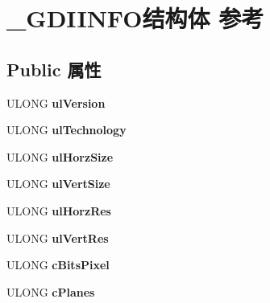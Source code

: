 \hypertarget{struct___g_d_i_i_n_f_o}{}\section{\+\_\+\+G\+D\+I\+I\+N\+F\+O结构体 参考}
\label{struct___g_d_i_i_n_f_o}
\subsection*{Public 属性}
\begin{DoxyCompactItemize}
\item 
\mbox{\label{struct___g_d_i_i_n_f_o_ad2dc1fe9ceb8cca06f349d38ad5433b0}} 
U\+L\+O\+NG {\bfseries ul\+Version}
\item 
\mbox{\label{struct___g_d_i_i_n_f_o_a502f4f5747602c9b7cb45afcba455518}} 
U\+L\+O\+NG {\bfseries ul\+Technology}
\item 
\mbox{\label{struct___g_d_i_i_n_f_o_abc5af8d569d960dd0b7408a09f5b00fa}} 
U\+L\+O\+NG {\bfseries ul\+Horz\+Size}
\item 
\mbox{\label{struct___g_d_i_i_n_f_o_a02eb98d0ad928e5e03af8429870d1ff3}} 
U\+L\+O\+NG {\bfseries ul\+Vert\+Size}
\item 
\mbox{\label{struct___g_d_i_i_n_f_o_acd63f4d201a3a234d2047ca73e8d906d}} 
U\+L\+O\+NG {\bfseries ul\+Horz\+Res}
\item 
\mbox{\label{struct___g_d_i_i_n_f_o_a7b30abec97e349c37adc05bead25104e}} 
U\+L\+O\+NG {\bfseries ul\+Vert\+Res}
\item 
\mbox{\label{struct___g_d_i_i_n_f_o_a74ef1e7728507279de3df4eecd8809ae}} 
U\+L\+O\+NG {\bfseries c\+Bits\+Pixel}
\item 
\mbox{\label{struct___g_d_i_i_n_f_o_ae8aaa935e36ba404be71f8e22668c02c}} 
U\+L\+O\+NG {\bfseries c\+Planes}
\item 
\mbox{\label{struct___g_d_i_i_n_f_o_a5682f0af185ac1ff731fdadf8bacb199}} 

\end{DoxyCompactItemize}
